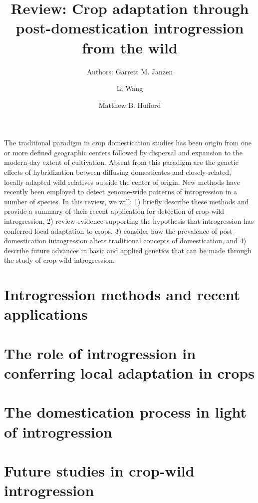\documentclass[11pt]{article}
\title{Review: Crop adaptation through post-domestication introgression from the wild}
\author[1]{Authors: Garrett M. Janzen}%
\author[1]{Li Wang}
\author[1,*]{Matthew B. Hufford}
\affil[1]{Department of Ecology, Evolution, and Organismal Biology, Iowa State University, Ames, Iowa, USA}
\affil[*]{Correspondence: mhufford@iastate.edu (M.B. Hufford)}
\date{}
\begin{document}
\maketitle

The traditional paradigm in crop domestication studies has been origin from one or more defined geographic centers followed by dispersal and expansion to the modern-day extent of cultivation.
Absent from this paradigm are the genetic effects of hybridization between diffusing domesticates and closely-related, locally-adapted wild relatives outside the center of origin.
New methods have recently been employed to detect genome-wide patterns of introgression in a number of species.
In this review, we will: 1) briefly describe these methods and provide a summary of their recent application for detection of crop-wild introgression, 2) review evidence supporting the hypothesis that introgression has conferred local adaptation to crops, 3) consider how the prevalence of post-domestication introgression alters traditional concepts of domestication, and 4) describe future advances in basic and applied genetics that can be made through the study of crop-wild introgression.

\section*{Introgression methods and recent applications}

\section*{The role of introgression in conferring local adaptation in crops}

\section*{The domestication process in light of introgression}

\section*{Future studies in crop-wild introgression}

\cite{Hufford2013}


\end{document}
